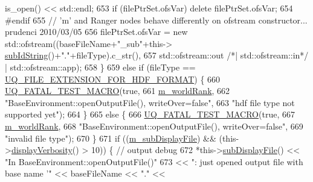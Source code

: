\begin{DoxyCode}
      is\_open() << std::endl;
653           \textcolor{keywordflow}{if} (filePtrSet.ofsVar) \textcolor{keyword}{delete} filePtrSet.ofsVar;
654 \textcolor{preprocessor}{#endif}
655 \textcolor{preprocessor}{}          \textcolor{comment}{// 'm' and Ranger nodes behave differently on ofstream constructor... prudenci 2010/03/05}
656           filePtrSet.ofsVar = \textcolor{keyword}{new} std::ofstream((baseFileName+\textcolor{stringliteral}{"\_sub"}+this->
      \hyperlink{class_q_u_e_s_o_1_1_base_environment_a73f7849acdd5d5ba15a3094fe18f258f}{subIdString}()+\textcolor{stringliteral}{"."}+fileType).c\_str(), 
657                                                 std::ofstream::out \textcolor{comment}{/*| std::ofstream::in*/} | 
      std::ofstream::app);
658         \}
659         \textcolor{keywordflow}{else} \textcolor{keywordflow}{if} (fileType == \hyperlink{_defines_8h_a4ebcc075277d031eb97c90b9a45f4493}{UQ\_FILE\_EXTENSION\_FOR\_HDF\_FORMAT}) \{
660           \hyperlink{_defines_8h_a56d63d18d0a6d45757de47fcc06f574d}{UQ\_FATAL\_TEST\_MACRO}(\textcolor{keyword}{true},
661                               \hyperlink{class_q_u_e_s_o_1_1_base_environment_a464cab923ada0e14c6e3a4000c2ea385}{m\_worldRank},
662                               \textcolor{stringliteral}{"BaseEnvironment::openOutputFile(), writeOver=false"},
663                               \textcolor{stringliteral}{"hdf file type not supported yet"});
664         \}
665         \textcolor{keywordflow}{else} \{
666           \hyperlink{_defines_8h_a56d63d18d0a6d45757de47fcc06f574d}{UQ\_FATAL\_TEST\_MACRO}(\textcolor{keyword}{true},
667                               \hyperlink{class_q_u_e_s_o_1_1_base_environment_a464cab923ada0e14c6e3a4000c2ea385}{m\_worldRank},
668                               \textcolor{stringliteral}{"BaseEnvironment::openOutputFile(), writeOver=false"},
669                               \textcolor{stringliteral}{"invalid file type"});
670         \}
671         \textcolor{keywordflow}{if} ((\hyperlink{class_q_u_e_s_o_1_1_base_environment_a52b4275aa8ee85994dd304d9fe95c9c5}{m\_subDisplayFile}) && (this->\hyperlink{class_q_u_e_s_o_1_1_base_environment_a1fe5f244fc0316a0ab3e37463f108b96}{displayVerbosity}() > 10)) \{ \textcolor{comment}{//
       output debug}
672           *this->\hyperlink{class_q_u_e_s_o_1_1_base_environment_a8a0064746ae8dddfece4229b9ad374d6}{subDisplayFile}() << \textcolor{stringliteral}{"In BaseEnvironment::openOutputFile()"}
673                                   << \textcolor{stringliteral}{": just opened output file with base name '"} << baseFileName << \textcolor{stringliteral}{"."} <<

\end{DoxyCode}

